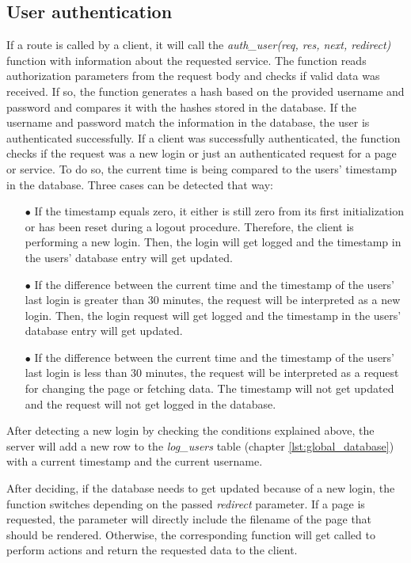 \subsection{User authentication}
\label{subsec:user_authentication}
If a route is called by a client, it will call the \textit{auth\_user(req, res, next, redirect)} function with information about the requested service.  The function reads authorization parameters from the request body and checks if valid data was received. If so, the function generates a hash based on the provided username and password and compares it with the hashes stored in the database. If the username and password match the information in the database, the user is authenticated successfully.
If a client was successfully authenticated, the function checks if the request was a new login or just an authenticated request for a page or service.  To do so, the current time is being compared to the users' timestamp in the database. Three cases can be detected that way:

\begin{itemize}
  \item[$\bullet$] If the timestamp equals zero, it either is still zero from its first initialization or has been reset during a logout procedure. Therefore, the client is performing a new login. Then, the login will get logged and the timestamp in the users' database entry will get updated.
  \item[$\bullet$] If the difference between the current time and the timestamp of the users' last login is greater than 30 minutes, the request will be interpreted as a new login.  Then, the login request will get logged and the timestamp in the users' database entry will get updated.
  \item[$\bullet$]  If the difference between the current time and the timestamp of the users' last login is less than 30 minutes, the request will be interpreted as a request for changing the page or fetching data. The timestamp will not get updated and the request will not get logged in the database.
\end{itemize}

After detecting a new login by checking the conditions explained above, the server will add a new row to the \textit{log\_users} table (chapter \ref{lst:global_database}) with a current timestamp and the current username.

After deciding, if the database needs to get updated because of a new login, the function switches depending on the passed \textit{redirect} parameter. If a page is requested, the parameter will directly include the filename of the page that should be rendered. Otherwise, the corresponding function will get called to perform actions and return the requested data to the client.



